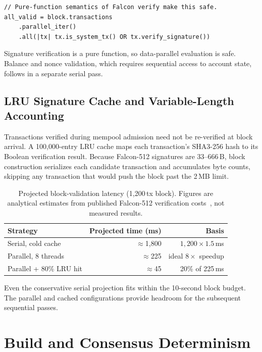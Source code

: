 \documentclass[11pt,a4paper]{article}
\begin{document}
\begin{lstlisting}[caption={Data-parallel block validation.}]
// Pure-function semantics of Falcon verify make this safe.
all_valid = block.transactions
    .parallel_iter()
    .all(|tx| tx.is_system_tx() OR tx.verify_signature())
\end{lstlisting}

Signature verification is a pure function, so data-parallel evaluation
is safe. Balance and nonce validation, which requires sequential access to
account state, follows in a separate serial pass.

\subsection{LRU Signature Cache and Variable-Length Accounting}

Transactions verified during mempool admission need not be re-verified at
block arrival. A 100,000-entry LRU cache maps each transaction's SHA3-256
hash to its Boolean verification result. Because Falcon-512 signatures are
33--666\,B, block construction serializes each candidate transaction and
accumulates byte counts, skipping any transaction that would push
the block past the 2\,MB limit.

\begin{table}[h]
\centering
\begin{tabular}{@{}lrr@{}}
\toprule
\textbf{Strategy} & \textbf{Projected time (ms)} & \textbf{Basis} \\
\midrule
Serial, cold cache           & $\approx$1{,}800 & $1{,}200 \times 1.5$\,ms \cite{pornin2022} \\
Parallel, 8 threads          & $\approx$225     & ideal $8\times$ speedup   \\
Parallel + 80\% LRU hit      & $\approx$45      & 20\% of 225\,ms           \\
\bottomrule
\end{tabular}
\caption{Projected block-validation latency (1,200\,tx block). Figures are
analytical estimates from published Falcon-512 verification
costs~\cite{pornin2022}, not measured results.}
\label{tab:timing}
\end{table}

Even the conservative serial projection fits within the 10-second block
budget. The parallel and cached configurations provide headroom for the
subsequent sequential passes.

\section{Build and Consensus Determinism}
\label{sec:determinism}
\end{document}
